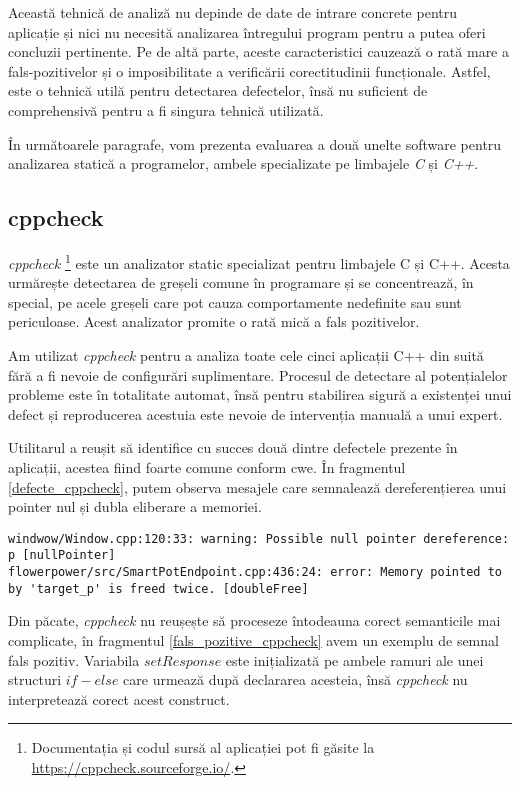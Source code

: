 Această tehnică de analiză nu depinde de date de intrare concrete pentru aplicație și nici nu necesită analizarea întregului program pentru a putea oferi concluzii pertinente. Pe de altă parte, aceste caracteristici cauzează o rată mare a fals-pozitivelor și o imposibilitate a verificării corectitudinii funcționale. Astfel, este o tehnică utilă pentru detectarea defectelor, însă nu suficient de comprehensivă pentru a fi singura tehnică utilizată.

În următoarele paragrafe, vom prezenta evaluarea a două unelte software pentru analizarea statică a programelor, ambele specializate pe limbajele \textit{C} și \textit{C++}.

\subsection*{cppcheck}

\textit{cppcheck} \footnote{Documentația și codul sursă al aplicației pot fi găsite la \url{https://cppcheck.sourceforge.io/}.} este un analizator static specializat pentru limbajele C și C++. Acesta urmărește detectarea de greșeli comune în programare și se concentrează, în special, pe acele greșeli care pot cauza comportamente nedefinite sau sunt periculoase. Acest analizator promite o rată mică a fals pozitivelor.

Am utilizat \textit{cppcheck} pentru a analiza toate cele cinci aplicații C++ din suită fără a fi nevoie de configurări suplimentare. Procesul de detectare al potențialelor probleme este în totalitate automat, însă pentru stabilirea sigură a existenței unui defect și reproducerea acestuia este nevoie de intervenția manuală a unui expert.

Utilitarul a reușit să identifice cu succes două dintre defectele prezente în aplicații, acestea fiind foarte comune conform \acrfull{cwe}. În fragmentul \ref{defecte_cppcheck}, putem observa mesajele care semnalează dereferențierea unui pointer nul și dubla eliberare a memoriei. 

\begin{lstlisting}[caption={Cele două defecte detectate de \textit{cppcheck}}, label={defecte_cppcheck}]
windwow/Window.cpp:120:33: warning: Possible null pointer dereference: p [nullPointer]
flowerpower/src/SmartPotEndpoint.cpp:436:24: error: Memory pointed to by 'target_p' is freed twice. [doubleFree]
\end{lstlisting}

Din păcate, \textit{cppcheck} nu reușește să proceseze întodeauna corect semanticile mai complicate, în fragmentul \ref{fals_pozitive_cppcheck} avem un exemplu de semnal fals pozitiv. Variabila $setResponse$ este inițializată pe ambele ramuri ale unei structuri $if - else$ care urmează după declararea acesteia, însă \textit{cppcheck} nu interpretează corect acest construct.

